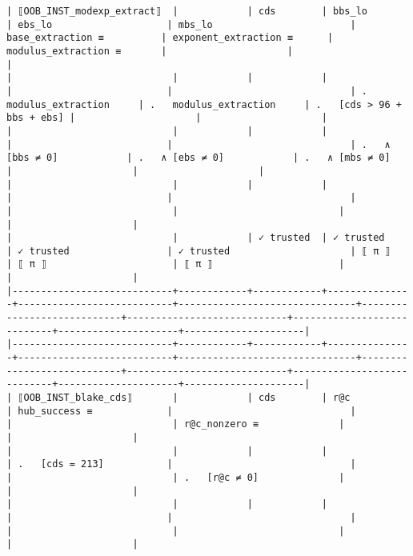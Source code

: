 \documentclass[varwidth=\maxdimen,margin=0.5cm,multi={verbatim}]{standalone}
\begin{document}
\begin{verbatim}
| ⟦OOB_INST_modexp_extract⟧  |            | cds        | bbs_lo        | ebs_lo                    | mbs_lo                        | base_extraction ≡          | exponent_extraction ≡      | modulus_extraction ≡       |                     |                     |
|                            |            |            |               |                           |                               | .   modulus_extraction     | .   modulus_extraction     | .   [cds > 96 + bbs + ebs] |                     |                     |
|                            |            |            |               |                           |                               | .   ∧ [bbs ≠ 0]            | .   ∧ [ebs ≠ 0]            | .   ∧ [mbs ≠ 0]            |                     |                     |
|                            |            |            |               |                           |                               |                            |                            |                            |                     |                     |
|                            |            | ✓ trusted  | ✓ trusted     | ✓ trusted                 | ✓ trusted                     | ⟦ π ⟧                      | ⟦ π ⟧                      | ⟦ π ⟧                      |                     |                     |
|----------------------------+------------+------------+---------------+---------------------------+-------------------------------+----------------------------+----------------------------+----------------------------+---------------------+---------------------|
|----------------------------+------------+------------+---------------+---------------------------+-------------------------------+----------------------------+----------------------------+----------------------------+---------------------+---------------------|
| ⟦OOB_INST_blake_cds⟧       |            | cds        | r@c           | hub_success ≡             |                               |                            |                            | r@c_nonzero ≡              |                     |                     |
|                            |            |            |               | .   [cds = 213]           |                               |                            |                            | .   [r@c ≠ 0]              |                     |                     |
|                            |            |            |               |                           |                               |                            |                            |                            |                     |                     |

\end{verbatim}
\end{document}
